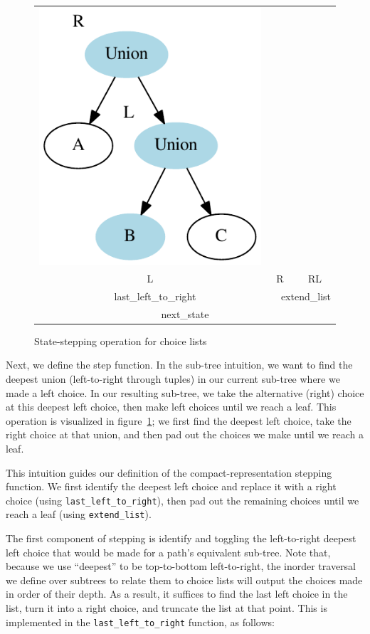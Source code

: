 \documentclass[a4paper,english]{lipics-v2019}
\begin{document}
\begin{figure}
\begin{tabular}{cccc}
\includegraphics[scale=0.6]{figures-gen/example3.pdf} \\
L & \multicolumn{2}{c}{R} & RL \\
\multicolumn{2}{c}{last\_left\_to\_right} & \multicolumn{2}{c}{extend\_list} \\
\hline
\multicolumn{4}{c}{next\_state} \\
\end{tabular}
\caption{State-stepping operation for choice lists}
\label{fig:sstep}
\end{figure}

Next, we define the step function. In the sub-tree intuition, we want to find
the deepest union (left-to-right through tuples) in our current sub-tree where
we made a left choice. In our resulting sub-tree, we take the alternative
(right) choice at this deepest left choice, then make left choices until we
reach a leaf. This operation is visualized in figure~\ref{fig:sstep}; we 
first find the deepest left choice, take the right choice at that union,
and then pad out the choices we make until we reach a leaf.

This intuition guides our definition of the compact-representation stepping
function. We first identify the deepest left choice and replace it with a
right choice (using \verb|last_left_to_right|), then pad out the remaining
choices until we reach a leaf (using \verb|extend_list|).

The first component of stepping is identify and toggling the left-to-right
deepest left choice that would be made for a path's equivalent sub-tree. Note
that, because we use ``deepest'' to be top-to-bottom left-to-right, the inorder
traversal we define over subtrees to relate them to choice lists will output the
choices made in order of their depth. As a result, it suffices to find the last
left choice in the list, turn it into a right choice, and truncate the list at that
point. This is implemented in the \verb|last_left_to_right| function, as follows:
\end{document}
